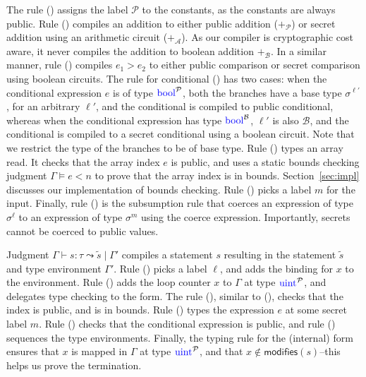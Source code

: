 The rule ({}) assigns the label $\mathcal{P}$ to the
constants, as the constants are always public. Rule ({})
compiles an addition to either public addition ($+_{\mathcal{P}}$) or
secret addition using an arithmetic circuit ($+_{\mathcal{A}}$). As
our compiler is cryptographic cost aware, it never compiles the
addition to boolean addition $+_{\mathcal{B}}$. In a similar manner,
rule ({}) compiles $e_{1} > e_{2}$ to either public comparison
or secret comparison using boolean circuits. The rule for conditional
({}) has two cases: when the conditional expression $e$ is of
type $\kw{bool}^{\mathcal{P}}$, both the branches have a base type
$\sigma^{\ell'}$, for an arbitrary $\ell'$, and the conditional is
compiled to public conditional, whereas when the conditional
expression has type $\kw{bool}^{\mathcal{B}}$, $\ell'$ is also
$\mathcal{B}$, and the conditional is compiled to a secret conditional
using a boolean circuit. Note that we restrict the type of the branches
to be of base type. Rule ({}) types an array read. It checks
that the array index $e$ is public, and uses a static bounds checking
judgment $\Gamma \models e < n$ to prove that the array index is in
bounds. Section~\ref{sec:impl} discusses our implementation of bounds
checking. Rule ({}) picks a label $m$ for the input. Finally,
rule ({}) is the subsumption rule that coerces an expression of
type $\sigma^{\ell}$ to an expression of type $\sigma^{m}$ using the
coerce expression. Importantly, secrets cannot be coerced to public
values.

Judgment $\Gamma \vdash s : \tau \leadsto \widetilde{s} \mid \Gamma'$
compiles a statement $s$ resulting in the statement $\widetilde{s}$
and type environment $\Gamma'$. Rule ({}) picks a label
$\ell$, and adds the binding for $x$ to the environment. Rule
({}) adds the loop counter $x$ to $\Gamma$ at type
$\kw{uint}^{\mathcal{P}}$, and delegates type checking to the
 form. The rule ({}), similar to ({}),
checks that the index is public, and is in bounds. Rule ({})
types the expression $e$ at some secret label $m$. Rule ({})
checks that the conditional expression is public, and rule
({}) sequences the type environments. Finally, the typing
rule for the (internal)  form ensures that $x$ is mapped in
$\Gamma$ at type $\kw{uint}^{\mathcal{P}}$, and that $x \notin
\mathsf{modifies}(s)$--this helps us prove the termination.

